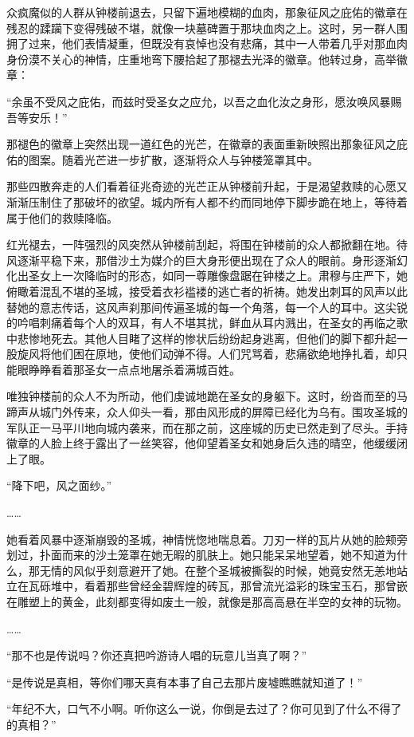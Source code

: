 众疯魔似的人群从钟楼前退去，只留下遍地模糊的血肉，那象征风之庇佑的徽章在残忍的蹂躏下变得残破不堪，就像一块墓碑置于那块血肉之上。这时，另一群人围拥了过来，他们表情凝重，但既没有哀悼也没有悲痛，其中一人带着几乎对那血肉身份漠不关心的神情，庄重地弯下腰拾起了那褪去光泽的徽章。他转过身，高举徽章：

“余虽不受风之庇佑，而兹时受圣女之应允，以吾之血化汝之身形，愿汝唤风暴赐吾等安乐！”

那褪色的徽章上突然出现一道红色的光芒，在徽章的表面重新映照出那象征风之庇佑的图案。随着光芒进一步扩散，逐渐将众人与钟楼笼罩其中。

那些四散奔走的人们看着征兆奇迹的光芒正从钟楼前升起，于是渴望救赎的心愿又渐渐压制住了那破坏的欲望。城内所有人都不约而同地停下脚步跪在地上，等待着属于他们的救赎降临。

红光褪去，一阵强烈的风突然从钟楼前刮起，将围在钟楼前的众人都掀翻在地。待风逐渐平稳下来，那借沙土为媒介的巨大身形便出现在了众人的眼前。身形逐渐幻化出圣女上一次降临时的形态，如同一尊雕像盘踞在钟楼之上。肃穆与庄严下，她俯瞰着混乱不堪的圣城，接受着衣衫褴褛的逃亡者的祈祷。她发出刺耳的风声以此替她的意志传话，这风声刹那间传遍圣城的每一个角落，每一个人的耳中。这尖锐的吟唱刺痛着每个人的双耳，有人不堪其扰，鲜血从耳内溅出，在圣女的再临之歌中悲惨地死去。其他人目睹了这样的惨状后纷纷起身逃离，但他们的脚下都升起一股旋风将他们困在原地，使他们动弹不得。人们咒骂着，悲痛欲绝地挣扎着，却只能眼睁睁看着那圣女一点点地屠杀着满城百姓。

唯独钟楼前的众人不为所动，他们虔诚地跪在圣女的身躯下。这时，纷沓而至的马蹄声从城门外传来，众人仰头一看，那由风形成的屏障已经化为乌有。围攻圣城的军队正一马平川地向城内袭来，而在那之前，这座城的历史已然走到了尽头。手持徽章的人脸上终于露出了一丝笑容，他仰望着圣女和她身后久违的晴空，他缓缓闭上了眼。

“降下吧，风之面纱。”

……

她看着风暴中逐渐崩毁的圣城，神情恍惚地喘息着。刀刃一样的瓦片从她的脸颊旁划过，扑面而来的沙土笼罩在她无暇的肌肤上。她只能呆呆地望着，她不知道为什么，那无情的风似乎刻意避开了她。在整个圣城被撕裂的时候，她竟安然无恙地站立在瓦砾堆中，看着那些曾经金碧辉煌的砖瓦，那曾流光溢彩的珠宝玉石，那曾嵌在雕塑上的黄金，此刻都变得如废土一般，就像是那高高悬在半空的女神的玩物。

……

“那不也是传说吗？你还真把吟游诗人唱的玩意儿当真了啊？”

“是传说是真相，等你们哪天真有本事了自己去那片废墟瞧瞧就知道了！”

“年纪不大，口气不小啊。听你这么一说，你倒是去过了？你可见到了什么不得了的真相？”

